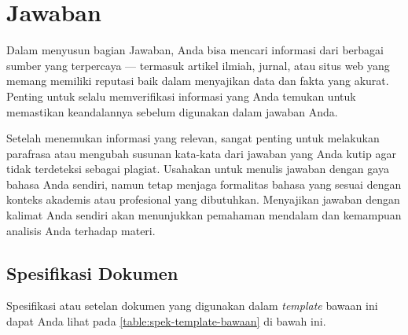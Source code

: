 \section{Jawaban}


Dalam menyusun bagian Jawaban, Anda bisa mencari informasi dari berbagai sumber yang terpercaya --- termasuk artikel ilmiah, jurnal, atau situs web yang memang memiliki reputasi baik dalam menyajikan data dan fakta yang akurat. Penting untuk selalu memverifikasi informasi yang Anda temukan untuk memastikan keandalannya sebelum digunakan dalam jawaban Anda.

Setelah menemukan informasi yang relevan, sangat penting untuk melakukan parafrasa atau mengubah susunan kata-kata dari jawaban yang Anda kutip agar tidak terdeteksi sebagai plagiat. Usahakan untuk menulis jawaban dengan gaya bahasa Anda sendiri, namun tetap menjaga formalitas bahasa yang sesuai dengan konteks akademis atau profesional yang dibutuhkan. Menyajikan jawaban dengan kalimat Anda sendiri akan menunjukkan pemahaman mendalam dan kemampuan analisis Anda terhadap materi.

\subsection{Spesifikasi Dokumen}

Spesifikasi atau setelan dokumen yang digunakan dalam \textit{template} bawaan ini dapat Anda lihat pada \autoref{table:spek-template-bawaan} di bawah ini.
    
